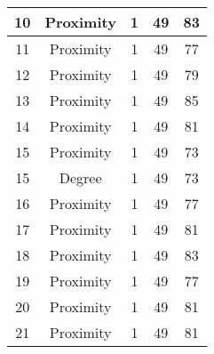 \documentclass[results.tex]{subfiles}
\begin{document}
\begin{center}
\begin{tabular}{| c || c | c | c | c |}
            \hline
            10                      & Proximity                    & 1                      & 49                      & 83                   \\
            \hline
            11                      & Proximity                    & 1                      & 49                      & 77                   \\
            \hline
            12                      & Proximity                    & 1                      & 49                      & 79                   \\
            \hline
            13                      & Proximity                    & 1                      & 49                      & 85                   \\
            \hline
            14                      & Proximity                    & 1                      & 49                      & 81                   \\
            \hline
            15                      & Proximity                    & 1                      & 49                      & 73                   \\
            \hline
            15                      & Degree                       & 1                      & 49                      & 73                   \\
            \hline
            16                      & Proximity                    & 1                      & 49                      & 77                   \\
            \hline
            17                      & Proximity                    & 1                      & 49                      & 81                   \\
            \hline
            18                      & Proximity                    & 1                      & 49                      & 83                   \\
            \hline
            19                      & Proximity                    & 1                      & 49                      & 77                   \\
            \hline
            20                      & Proximity                    & 1                      & 49                      & 81                   \\
            \hline
            21                      & Proximity                    & 1                      & 49                      & 81                   \\

\end{tabular}
\end{center}
\end{document}
